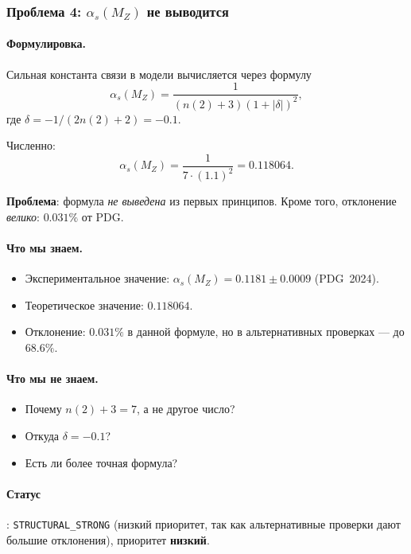 \documentclass[11pt,a4paper]{article}
\theoremstyle{definition}
\begin{document}
\subsubsection{Проблема 4: \texorpdfstring{$\alpha_s(M_Z)$}{\_s(M\_Z)} не выводится}

\paragraph{Формулировка.}
Сильная константа связи в модели вычисляется через формулу
\begin{equation}
    \alpha_s(M_Z) = \frac{1}{(n(2) + 3)(1 + |\delta|)^2},
    \label{eq:alphas-formula}
\end{equation}
где $\delta = -1/(2 n(2) + 2) = -0.1$.

Численно:
\begin{equation}
    \alpha_s(M_Z) = \frac{1}{7 \cdot (1.1)^2} = 0.118064.
\end{equation}

\medskip\noindent
\textbf{Проблема}: формула \emph{не выведена} из первых
принципов. Кроме того, отклонение \emph{велико}:
$0.031\%$ от PDG.

\paragraph{Что мы знаем.}
\begin{itemize}
    \item Экспериментальное значение:
          $\alpha_s(M_Z) = 0.1181 \pm 0.0009$ (PDG~2024).
    \item Теоретическое значение: $0.118064$.
    \item Отклонение: $0.031\%$ в данной формуле, но в
          альтернативных проверках --- до $68.6\%$.
\end{itemize}

\paragraph{Что мы не знаем.}
\begin{itemize}
    \item Почему $n(2) + 3 = 7$, а не другое число?
    \item Откуда $\delta = -0.1$?
    \item Есть ли более точная формула?
\end{itemize}

\paragraph{Статус}: \texttt{STRUCTURAL\_STRONG} (низкий приоритет,
так как альтернативные проверки дают большие отклонения),
приоритет \textbf{низкий}.
\end{document}
